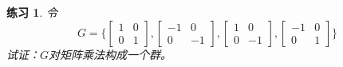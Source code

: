 \documentclass{article}
\newtheorem{Exercise}{练习}
\begin{document}
\begin{CJK*}{UTF8}{gbsn}
\begin{Exercise}
 令
 \[G=\bigg\{\begin{bmatrix}
  1&0\\0&1
 \end{bmatrix},
 \begin{bmatrix}
  -1&0\\0&-1
 \end{bmatrix},
 \begin{bmatrix}
  1&0\\0&-1
 \end{bmatrix},
 \begin{bmatrix}
  -1&0\\0&1
 \end{bmatrix}\bigg\}\] 
 试证：$G$对矩阵乘法构成一个群。
\end{Exercise}




\end{CJK*}
\end{document}
